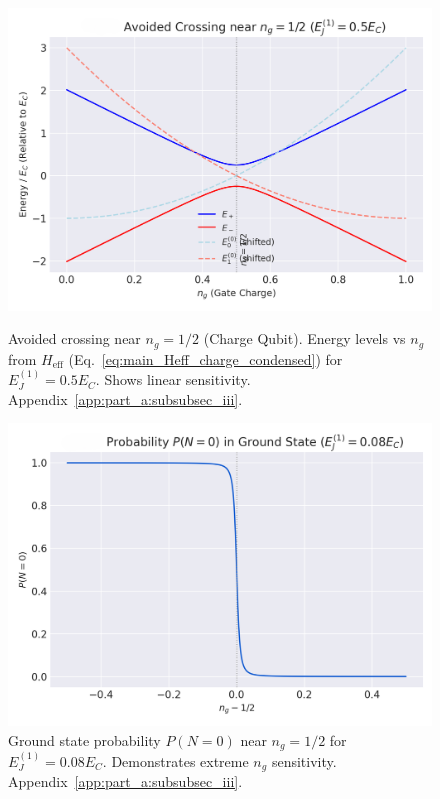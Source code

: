 \documentclass[12pt]{article}
\begin{document}
\begin{figure}[htbp] 
    \centering
    \begin{minipage}{0.48\textwidth}
        \centering
        \includegraphics[width=\textwidth]{fig_avoid_crossing.png}
        \caption{Avoided crossing near $n_g = 1/2$ (Charge Qubit). Energy levels vs $n_g$ from $H_{\text{eff}}$ (Eq.~\eqref{eq:main_Heff_charge_condensed}) for $E_J^{(1)} = 0.5 E_C$. Shows linear sensitivity. Appendix~\ref{app:part_a:subsubsec_iii}.}
        \label{fig:main_avoid_crossing_condensed}
    \end{minipage}\hfill 
    \begin{minipage}{0.48\textwidth}
        \centering
        \includegraphics[width=\textwidth]{fig_charge_prob.png}
        \caption{Ground state probability $P(N=0)$ near $n_g=1/2$ for $E_J^{(1)} = 0.08 E_C$. Demonstrates extreme $n_g$ sensitivity. Appendix~\ref{app:part_a:subsubsec_iii}.}
        \label{fig:main_charge_prob_condensed}
    \end{minipage}
\end{figure}
\end{document}
